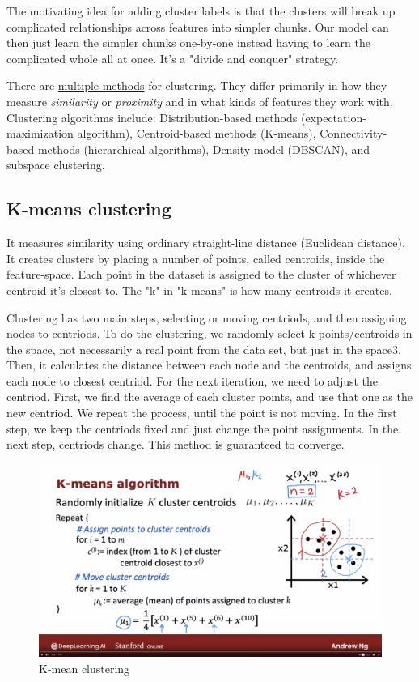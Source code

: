 \documentclass[12pt]{report}
\begin{document}
The motivating idea for adding cluster labels is that the clusters will break up complicated relationships across features into simpler chunks. Our model can then just learn the simpler chunks one-by-one instead having to learn the complicated whole all at once. It's a "divide and conquer" strategy.

There are \href{https://www.geeksforgeeks.org/different-types-clustering-algorithm/#}{multiple methods} for clustering. They differ primarily in how they measure \textit{similarity} or \textit{proximity} and in what kinds of features they work with. Clustering algorithms include: Distribution-based methods (expectation-maximization algorithm), Centroid-based methods (K-means), Connectivity-based methods (hierarchical algorithms), Density model (DBSCAN), and subspace clustering.

\subsection{K-means clustering}
It measures similarity using ordinary straight-line distance (Euclidean distance). It creates clusters by placing a number of points, called centroids, inside the feature-space. Each point in the dataset is assigned to the cluster of whichever centroid it's closest to. The "k" in "k-means" is how many centroids it creates.

Clustering has two main steps, selecting or moving centriods, and then assigning nodes to centriods. To do the clustering, we randomly select k points/centroids in the space, not necessarily a real point from the data set, but just in the space3. Then, it calculates the distance between each node and the centroids, and assigns each node to closest centriod. For the next iteration, we need to adjust the centriod. First, we find the average of each cluster points, and use that one as the new centriod. We repeat the process, until the point is not moving. In the first step, we keep the centriods fixed and just change the point assignments. In the next step, centriods change. This method is guaranteed to converge.

\begin{figure}[H]
  \centering
  \includegraphics[trim =0.0cm 0.0cm 0.0cm 0.0cm, clip, scale=0.15]{pics/cluster.png}
  \caption{K-mean clustering}
\end{figure}
\end{document}
